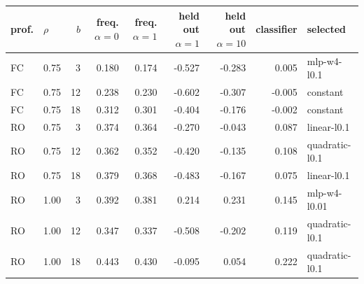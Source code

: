 \begin{tabular}{llr rrrr rl}
\toprule
prof. & $\rho$ & $b$ & freq. $\alpha{=}0$ & freq. $\alpha{=}1$ & held out $\alpha{=}1$ & held out $\alpha{=}10$ & classifier & selected \\
\midrule
FC & 0.75 & 3 & 0.180 & 0.174 & -0.527 & -0.283 & 0.005 & mlp-w4-l0.1 \\
FC & 0.75 & 12 & 0.238 & 0.230 & -0.602 & -0.307 & -0.005 & constant \\
FC & 0.75 & 18 & 0.312 & 0.301 & -0.404 & -0.176 & -0.002 & constant \\
RO & 0.75 & 3 & 0.374 & 0.364 & -0.270 & -0.043 & 0.087 & linear-l0.1 \\
RO & 0.75 & 12 & 0.362 & 0.352 & -0.420 & -0.135 & 0.108 & quadratic-l0.1 \\
RO & 0.75 & 18 & 0.379 & 0.368 & -0.483 & -0.167 & 0.075 & linear-l0.1 \\
RO & 1.00 & 3 & 0.392 & 0.381 & 0.214 & 0.231 & 0.145 & mlp-w4-l0.01 \\
RO & 1.00 & 12 & 0.347 & 0.337 & -0.508 & -0.202 & 0.119 & quadratic-l0.1 \\
RO & 1.00 & 18 & 0.443 & 0.430 & -0.095 & 0.054 & 0.222 & quadratic-l0.1 \\
\bottomrule
\end{tabular}